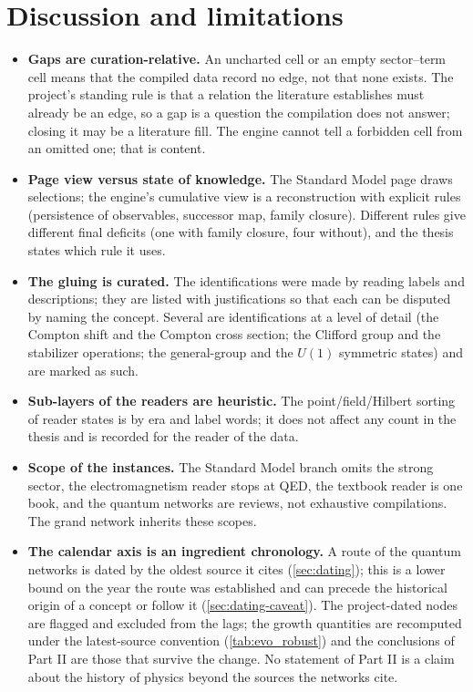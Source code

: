 \documentclass[11pt,a4paper,twoside,openany]{report}
\theoremstyle{plain}
\theoremstyle{definition}
\theoremstyle{remark}
\begin{document}
\chapter{Discussion and limitations}\label{ch:limits}
\begin{itemize}
\item \textbf{Gaps are curation-relative.} An uncharted cell or an empty sector--term cell means that the compiled data record no edge, not that none exists. The project's standing rule is that a relation the literature establishes must already be an edge, so a gap is a question the compilation does not answer; closing it may be a literature fill. The engine cannot tell a forbidden cell from an omitted one; that is content.
\item \textbf{Page view versus state of knowledge.} The Standard Model page draws selections; the engine's cumulative view is a reconstruction with explicit rules (persistence of observables, successor map, family closure). Different rules give different final deficits (one with family closure, four without), and the thesis states which rule it uses.
\item \textbf{The gluing is curated.} The \NnConcepts{} identifications were made by reading labels and descriptions; they are listed with justifications so that each can be disputed by naming the concept. Several are identifications at a level of detail (the Compton shift and the Compton cross section; the Clifford group and the stabilizer operations; the general-group and the $U(1)$ symmetric states) and are marked as such.
\item \textbf{Sub-layers of the readers are heuristic.} The point/field/Hilbert sorting of reader states is by era and label words; it does not affect any count in the thesis and is recorded for the reader of the data.
\item \textbf{Scope of the instances.} The Standard Model branch omits the strong sector, the electromagnetism reader stops at QED, the textbook reader is one book, and the quantum networks are reviews, not exhaustive compilations. The grand network inherits these scopes.
\item \textbf{The calendar axis is an ingredient chronology.} A route of the quantum networks is dated by the oldest source it cites (\cref{sec:dating}); this is a lower bound on the year the route was established and can precede the historical origin of a concept or follow it (\cref{sec:dating-caveat}). The project-dated nodes are flagged and excluded from the lags; the growth quantities are recomputed under the latest-source convention (\cref{tab:evo_robust}) and the conclusions of Part II are those that survive the change. No statement of Part II is a claim about the history of physics beyond the sources the networks cite.

\end{itemize}
\end{document}

